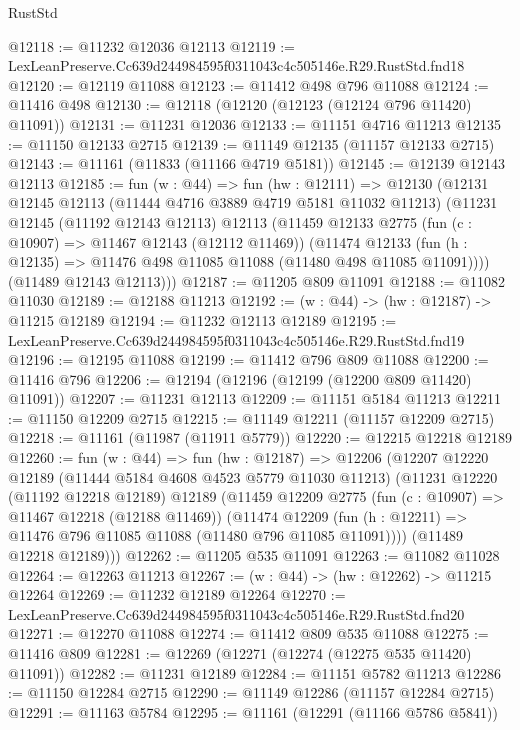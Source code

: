 \begin{lexlean}{RustStd}
\begin{coremodule}
@12118 := @11232 @12036 @12113
@12119 := LexLeanPreserve.Cc639d244984595f0311043c4c505146e.R29.RustStd.fnd18
@12120 := @12119 @11088
@12123 := @11412 @498 @796 @11088
@12124 := @11416 @498
@12130 := @12118 (@12120 (@12123 (@12124 @796 @11420) @11091))
@12131 := @11231 @12036
@12133 := @11151 @4716 @11213
@12135 := @11150 @12133 @2715
@12139 := @11149 @12135 (@11157 @12133 @2715)
@12143 := @11161 (@11833 (@11166 @4719 @5181))
@12145 := @12139 @12143 @12113
@12185 := fun (w : @44) =>
  fun (hw : @12111) =>
  @12130
    (@12131
      @12145
      @12113
      (@11444 @4716 @3889 @4719 @5181 @11032 @11213)
      (@11231
        @12145
        (@11192 @12143 @12113)
        @12113
        (@11459
          @12133
          @2775
          (fun (c : @10907) => @11467 @12143 (@12112 @11469))
          (@11474
            @12133
            (fun (h : @12135) => @11476 @498 @11085 @11088 (@11480 @498 @11085 @11091))))
        (@11489 @12143 @12113)))
@12187 := @11205 @809 @11091
@12188 := @11082 @11030
@12189 := @12188 @11213
@12192 := (w : @44) -> (hw : @12187) -> @11215 @12189
@12194 := @11232 @12113 @12189
@12195 := LexLeanPreserve.Cc639d244984595f0311043c4c505146e.R29.RustStd.fnd19
@12196 := @12195 @11088
@12199 := @11412 @796 @809 @11088
@12200 := @11416 @796
@12206 := @12194 (@12196 (@12199 (@12200 @809 @11420) @11091))
@12207 := @11231 @12113
@12209 := @11151 @5184 @11213
@12211 := @11150 @12209 @2715
@12215 := @11149 @12211 (@11157 @12209 @2715)
@12218 := @11161 (@11987 (@11911 @5779))
@12220 := @12215 @12218 @12189
@12260 := fun (w : @44) =>
  fun (hw : @12187) =>
  @12206
    (@12207
      @12220
      @12189
      (@11444 @5184 @4608 @4523 @5779 @11030 @11213)
      (@11231
        @12220
        (@11192 @12218 @12189)
        @12189
        (@11459
          @12209
          @2775
          (fun (c : @10907) => @11467 @12218 (@12188 @11469))
          (@11474
            @12209
            (fun (h : @12211) => @11476 @796 @11085 @11088 (@11480 @796 @11085 @11091))))
        (@11489 @12218 @12189)))
@12262 := @11205 @535 @11091
@12263 := @11082 @11028
@12264 := @12263 @11213
@12267 := (w : @44) -> (hw : @12262) -> @11215 @12264
@12269 := @11232 @12189 @12264
@12270 := LexLeanPreserve.Cc639d244984595f0311043c4c505146e.R29.RustStd.fnd20
@12271 := @12270 @11088
@12274 := @11412 @809 @535 @11088
@12275 := @11416 @809
@12281 := @12269 (@12271 (@12274 (@12275 @535 @11420) @11091))
@12282 := @11231 @12189
@12284 := @11151 @5782 @11213
@12286 := @11150 @12284 @2715
@12290 := @11149 @12286 (@11157 @12284 @2715)
@12291 := @11163 @5784
@12295 := @11161 (@12291 (@11166 @5786 @5841))

\end{coremodule}
\end{lexlean}
